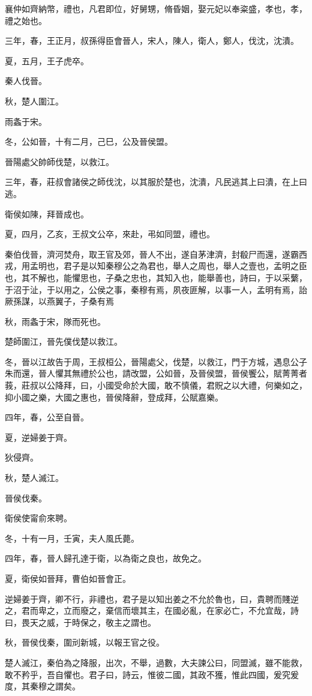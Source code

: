 \begin{pinyinscope}
襄仲如齊納幣，禮也，凡君即位，好舅甥，脩昏姻，娶元妃以奉粢盛，孝也，孝，禮之始也。

三年，春，王正月，叔孫得臣會晉人，宋人，陳人，衛人，鄭人，伐沈，沈潰。

夏，五月，王子虎卒。

秦人伐晉。

秋，楚人圍江。

雨螽于宋。

冬，公如晉，十有二月，己巳，公及晉侯盟。

晉陽處父帥師伐楚，以救江。

三年，春，莊叔會諸侯之師伐沈，以其服於楚也，沈潰，凡民逃其上曰潰，在上曰逃。

衛侯如陳，拜晉成也。

夏，四月，乙亥，王叔文公卒，來赴，弔如同盟，禮也。

秦伯伐晉，濟河焚舟，取王官及郊，晉人不出，遂自茅津濟，封殽尸而還，遂霸西戎，用孟明也，君子是以知秦穆公之為君也，舉人之周也，舉人之壹也，孟明之臣也，其不解也，能懼思也，子桑之忠也，其知入也，能舉善也，詩曰，于以采蘩，于沼于沚，于以用之，公侯之事，秦穆有焉，夙夜匪解，以事一人，孟明有焉，詒厥孫謀，以燕翼子，子桑有焉

秋，雨螽于宋，隊而死也。

楚師圍江，晉先僕伐楚以救江。

冬，晉以江故告于周，王叔桓公，晉陽處父，伐楚，以救江，門于方城，遇息公子朱而還，晉人懼其無禮於公也，請改盟，公如晉，及晉侯盟，晉侯饗公，賦菁菁者莪，莊叔以公降拜，曰，小國受命於大國，敢不慎儀，君貺之以大禮，何樂如之，抑小國之樂，大國之惠也，晉侯降辭，登成拜，公賦嘉樂。

四年，春，公至自晉。

夏，逆婦姜于齊。

狄侵齊。

秋，楚人滅江。

晉侯伐秦。

衛侯使甯俞來聘。

冬，十有一月，壬寅，夫人風氏薨。

四年，春，晉人歸孔達于衛，以為衛之良也，故免之。

夏，衛侯如晉拜，曹伯如晉會正。

逆婦姜于齊，卿不行，非禮也，君子是以知出姜之不允於魯也，曰，貴聘而賤逆之，君而卑之，立而廢之，棄信而壞其主，在國必亂，在家必亡，不允宜哉，詩曰，畏天之威，于時保之，敬主之謂也。

秋，晉侯伐秦，圍刓新城，以報王官之役。

楚人滅江，秦伯為之降服，出次，不舉，過數，大夫諫公曰，同盟滅，雖不能救，敢不矜乎，吾自懼也。君子曰，詩云，惟彼二國，其政不獲，惟此四國，爰究爰度，其秦穆之謂矣。


\end{pinyinscope}
